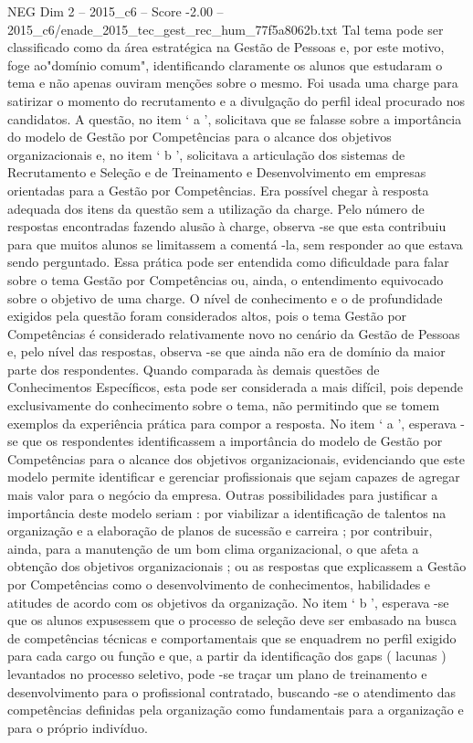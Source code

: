 \begin{textsample}{NEG Dim 2 – 2015\_c6 – Score -2.00 – 2015\_c6/enade\_2015\_tec\_gest\_rec\_hum\_77f5a8062b.txt}
Tal tema pode ser classificado como da área estratégica na Gestão de Pessoas e, por este motivo, foge ao"domínio comum", identificando claramente os alunos que estudaram o tema e não apenas ouviram menções sobre o mesmo.
Foi usada uma charge para satirizar o momento do recrutamento e a divulgação do perfil ideal procurado nos candidatos.
A questão, no item ‘ a ’, solicitava que se falasse sobre a importância do modelo de Gestão por Competências para o alcance dos objetivos organizacionais e, no item ‘ b ’, solicitava a articulação dos sistemas de Recrutamento e Seleção e de Treinamento e Desenvolvimento em empresas orientadas para a Gestão por Competências.
Era possível chegar à resposta adequada dos itens da questão sem a utilização da charge.
Pelo número de respostas encontradas fazendo alusão à charge, observa -se que esta contribuiu para que muitos alunos se limitassem a comentá -la, sem responder ao que estava sendo perguntado.
Essa prática pode ser entendida como dificuldade para falar sobre o tema Gestão por Competências ou, ainda, o entendimento equivocado sobre o objetivo de uma charge.
O nível de conhecimento e o de profundidade exigidos pela questão foram considerados altos, pois o tema Gestão por Competências é considerado relativamente novo no cenário da Gestão de Pessoas e, pelo nível das respostas, observa -se que ainda não era de domínio da maior parte dos respondentes.
Quando comparada às demais questões de Conhecimentos Específicos, esta pode ser considerada a mais difícil, pois depende exclusivamente do conhecimento sobre o tema, não permitindo que se tomem exemplos da experiência prática para compor a resposta.
No item ‘ a ’, esperava -se que os respondentes identificassem a importância do modelo de Gestão por Competências para o alcance dos objetivos organizacionais, evidenciando que este modelo permite identificar e gerenciar profissionais que sejam capazes de agregar mais valor para o negócio da empresa.
Outras possibilidades para justificar a importância deste modelo seriam : por viabilizar a identificação de talentos na organização e a elaboração de planos de sucessão e carreira ; por contribuir, ainda, para a manutenção de um bom clima organizacional, o que afeta a obtenção dos objetivos organizacionais ; ou as respostas que explicassem a Gestão por Competências como o desenvolvimento de conhecimentos, habilidades e atitudes de acordo com os objetivos da organização.
No item ‘ b ’, esperava -se que os alunos expusessem que o processo de seleção deve ser embasado na busca de competências técnicas e comportamentais que se enquadrem no perfil exigido para cada cargo ou função e que, a partir da identificação dos gaps ( lacunas ) levantados no processo seletivo, pode -se traçar um plano de treinamento e desenvolvimento para o profissional contratado, buscando -se o atendimento das competências definidas pela organização como fundamentais para a organização e para o próprio indivíduo.

\end{textsample}
